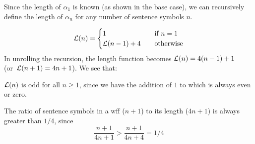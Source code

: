 \begin{problem}
\begin{Answer}
    \noindent
    Since the length of $\alpha_1$ is known (as shown in the base case),
    we can recursively define the length of $\alpha_n$
    for any number of sentence symbols $n$.
    
    \begin{align*}
      \mathcal{L}(n) = \begin{cases}
        1 \quad &\text{if $n = 1$} \\
        \mathcal{L}(n-1) + 4 \quad &\text{otherwise}
      \end{cases}
    \end{align*}
    In unrolling the recursion, the length function
    becomes $\mathcal{L}(n) = 4(n-1) + 1$ \\ (or~$\mathcal{L}(n+1)= 4n + 1$).
    We see that:
    \begin{enumalph}
      \item $\mathcal{L}(n)$ is odd for all $n \geq 1$, since we have
        the addition of $1$ to  which is always even or zero.
      \item The ratio of sentence symbols in a wff ($n+1$) to its length ($4n + 1$)
        is always greater than $1/4$, since
        \[ \frac{n + 1}{4n + 1} > \frac{n+1}{4n+4} = 1/4 \]
    \end{enumalph}
  \end{Answer}
\end{problem}
